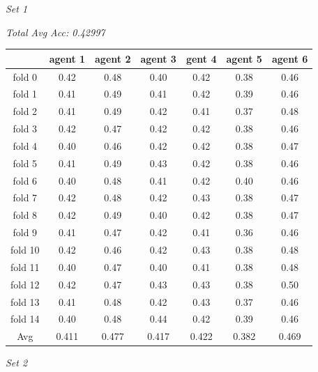 \documentclass[10pt]{article}
\begin{document}
  \begin{center}

    \textit{Set 1}

    \textit{Total Avg Acc: 0.42997}
    \footnotesize
    \begin{tabular}{| c | c | c | c | c | c | c |}
      \hline
       & agent 1 & agent 2 & agent 3 & gent 4 & agent 5 & agent 6 \\
      \hline
      fold 0 & 0.42 & 0.48 & 0.40 &  0.42 &  0.38 & 0.46 \\
      fold 1 & 0.41 & 0.49 & 0.41 &  0.42 &  0.39 & 0.46 \\
      fold 2 & 0.41 & 0.49 & 0.42 &  0.41 &  0.37 & 0.48 \\
      fold 3 & 0.42 & 0.47 & 0.42 &  0.42 &  0.38 & 0.46 \\
      fold 4 & 0.40 & 0.46 & 0.42 &  0.42 &  0.38 & 0.47 \\
      fold 5 & 0.41 & 0.49 & 0.43 &  0.42 &  0.38 & 0.46 \\
      fold 6 & 0.40 & 0.48 & 0.41 &  0.42 &  0.40 & 0.46 \\
      fold 7 & 0.42 & 0.48 & 0.42 &  0.43 &  0.38 & 0.47 \\
      fold 8 & 0.42 & 0.49 & 0.40 &  0.42 &  0.38 & 0.47 \\
      fold 9 & 0.41 & 0.47 & 0.42 &  0.41 &  0.36 & 0.46 \\
      fold 10 & 0.42 & 0.46 & 0.42 &  0.43 &  0.38 & 0.48 \\
      fold 11 & 0.40 & 0.47 & 0.40 &  0.41 &  0.38 & 0.48 \\
      fold 12 & 0.42 & 0.47 & 0.43 &  0.43 &  0.38 & 0.50 \\
      fold 13 & 0.41 & 0.48 & 0.42 &  0.43 &  0.37 & 0.46 \\
      fold 14 & 0.40 & 0.48 & 0.44 &  0.42 &  0.39 & 0.46 \\
      Avg  & 0.411 & 0.477 & 0.417 &  0.422 &  0.382 & 0.469 \\
      \hline
    \end{tabular}
    \normalsize

    \newpage

    \textit{Set 2}


\end{center}
\end{document}
